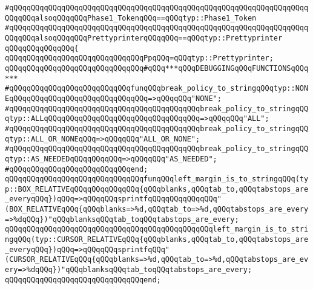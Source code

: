 \verb|#qQQqqQQqqQQqqQQqqQQqqQQqqQQqqQQqqQQqqQQqqQQqqQQqqQQqqQQqqQQqqQQqqQQqqQQqqQQqalsoqQQqqQQqPhase1_TokenqQQq==qQQqtyp::Phase1_Token|\newline
\verb|#qQQqqQQqqQQqqQQqqQQqqQQqqQQqqQQqqQQqqQQqqQQqqQQqqQQqqQQqqQQqqQQqqQQqqQQqqQQqalsoqQQqqQQqPrettyprinterqQQqqQQq==qQQqtyp::Prettyprinter|\newline
\verb|qQQqqQQqqQQqqQQq{|\newline
\verb|qQQqqQQqqQQqqQQqqQQqqQQqqQQqqQQqPpqQQq=qQQqtyp::Prettyprinter;|\newline
\newline
\newline
\verb|qQQqqQQqqQQqqQQqqQQqqQQqqQQqqQQq#qQQq***qQQqDEBUGGINGqQQqFUNCTIONSqQQq***|\newline
\newline
\newline
\verb|#qQQqqQQqqQQqqQQqqQQqqQQqqQQqfunqQQqbreak_policy_to_stringqQQqtyp::NONEqQQqqQQqqQQqqQQqqQQqqQQqqQQqqQQq=>qQQqqQQq"NONE";|\newline
\verb|#qQQqqQQqqQQqqQQqqQQqqQQqqQQqqQQqqQQqqQQqqQQqbreak_policy_to_stringqQQqtyp::ALLqQQqqQQqqQQqqQQqqQQqqQQqqQQqqQQqqQQq=>qQQqqQQq"ALL";|\newline
\verb|#qQQqqQQqqQQqqQQqqQQqqQQqqQQqqQQqqQQqqQQqqQQqbreak_policy_to_stringqQQqtyp::ALL_OR_NONEqQQq=>qQQqqQQq"ALL_OR_NONE";|\newline
\verb|#qQQqqQQqqQQqqQQqqQQqqQQqqQQqqQQqqQQqqQQqqQQqbreak_policy_to_stringqQQqtyp::AS_NEEDEDqQQqqQQqqQQq=>qQQqqQQq"AS_NEEDED";|\newline
\verb|#qQQqqQQqqQQqqQQqqQQqqQQqqQQqend;|\newline
\newline
\newline
\verb|qQQqqQQqqQQqqQQqqQQqqQQqqQQqqQQqfunqQQqleft_margin_is_to_stringqQQq(typ::BOX_RELATIVEqQQqqQQqqQQqqQQq{qQQqblanks,qQQqtab_to,qQQqtabstops_are_everyqQQq})qQQq=>qQQqqQQqsprintfqQQqqQQqqQQqqQQq"(BOX_RELATIVEqQQq{qQQqblanks=>%d,qQQqtab_to=>%d,qQQqtabstops_are_every=>%dqQQq})"qQQqblanksqQQqtab_toqQQqtabstops_are_every;|\newline
\verb|qQQqqQQqqQQqqQQqqQQqqQQqqQQqqQQqqQQqqQQqqQQqqQQqleft_margin_is_to_stringqQQq(typ::CURSOR_RELATIVEqQQq{qQQqblanks,qQQqtab_to,qQQqtabstops_are_everyqQQq})qQQq=>qQQqqQQqsprintfqQQq"(CURSOR_RELATIVEqQQq{qQQqblanks=>%d,qQQqtab_to=>%d,qQQqtabstops_are_every=>%dqQQq})"qQQqblanksqQQqtab_toqQQqtabstops_are_every;|\newline
\verb|qQQqqQQqqQQqqQQqqQQqqQQqqQQqqQQqend;|\newline
